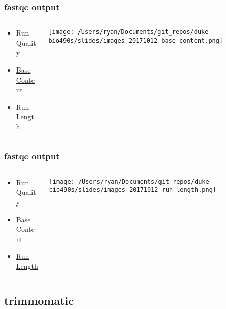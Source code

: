 \documentclass[14pt,handout]{beamer}
\begin{document}
\begin{frame}
\frametitle{fastqc output}
\begin{columns}
	\begin{column}{0.35\textwidth}
		\begin{itemize}
			\item Run Quality
			\item \underline{Base Content}
			\item Run Length
		\end{itemize}
		\end{column}
	\begin{column}{0.65\textwidth}
		\begin{center}
     		\texttt{[image: /Users/ryan/Documents/git\_repos/duke-bio490s/slides/images\_20171012\_base\_content.png]}
     	\end{center}
	\end{column}
\end{columns}
\end{frame}

\begin{frame}
\frametitle{fastqc output}
\begin{columns}
	\begin{column}{0.35\textwidth}
		\begin{itemize}
			\item Run Quality
			\item Base Content
			\item \underline{Run Length}
		\end{itemize}
		\end{column}
	\begin{column}{0.65\textwidth}
		\begin{center}
     		\texttt{[image: /Users/ryan/Documents/git\_repos/duke-bio490s/slides/images\_20171012\_run\_length.png]}
     	\end{center}
	\end{column}
\end{columns}
\end{frame}

\subsection{trimmomatic}
\end{document}

